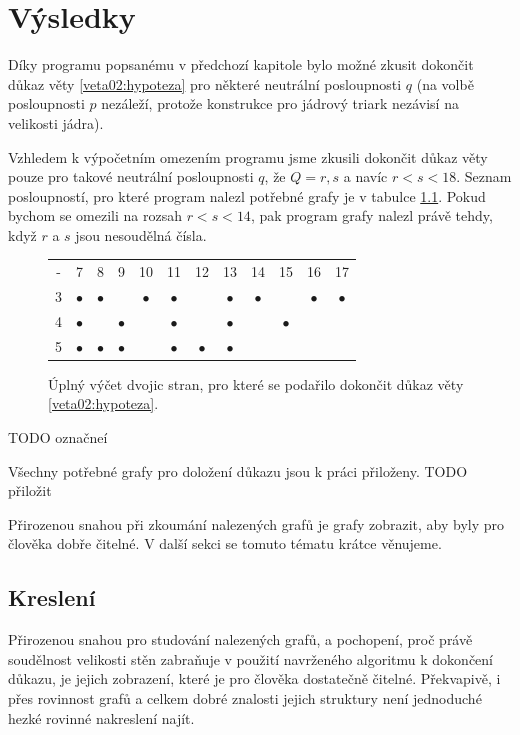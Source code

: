 
\chapter{Výsledky} \label{vysledky}

Díky programu popsanému v předchozí kapitole bylo možné zkusit dokončit důkaz věty \eqref{veta02:hypoteza} pro některé neutrální posloupnosti $q$ (na volbě posloupnosti $p$ nezáleží, protože konstrukce pro jádrový triark nezávisí na velikosti jádra). 

Vzhledem k výpočetním omezením programu jsme zkusili dokončit důkaz věty pouze pro takové neutrální posloupnosti $q$, že $Q = {r, s}$ a navíc $r<s<18$. Seznam posloupností, pro které program nalezl potřebné grafy je v tabulce \ref{obr03:tabvysledky}. Pokud bychom se omezili na rozsah $r<s<14$, pak program grafy nalezl právě tehdy, když $r$ a $s$ jsou nesoudělná čísla.

\begin{figure}[h]\centering
\begin{tabular}{ c c c c c c c c c c c c }
  - & 7 & 8 & 9 & 10 & 11 & 12 & 13 & 14 & 15 & 16 & 17 \\
  3 & $\bullet$ & $\bullet$ &  & $\bullet$ & $\bullet$ &  & $\bullet$ & $\bullet$ &  & $\bullet$ & $\bullet$ \\
  4 & $\bullet$ &  & $\bullet$ &  & $\bullet$ &  & $\bullet$ &  & $\bullet$ \\
  5 & $\bullet$ & $\bullet$ & $\bullet$ &  & $\bullet$ & $\bullet$ & $\bullet$  
\end{tabular}
\caption{Úplný výčet dvojic stran, pro které se podařilo dokončit důkaz věty \eqref{veta02:hypoteza}.}
\label{obr03:tabvysledky}
\end{figure}
TODO označneí

Všechny potřebné grafy pro doložení důkazu jsou k práci přiloženy. TODO přiložit

Přirozenou snahou při zkoumání nalezených grafů je grafy zobrazit, aby byly pro člověka dobře čitelné. V další sekci se tomuto tématu krátce věnujeme. 

\section{Kreslení}

Přirozenou snahou pro studování nalezených grafů, a pochopení, proč právě soudělnost velikosti stěn zabraňuje v použití navrženého algoritmu k dokončení důkazu, je jejich zobrazení, které je pro člověka dostatečně čitelné. Překvapivě, i přes rovinnost grafů a celkem dobré znalosti jejich struktury není jednoduché hezké rovinné nakreslení najít.

